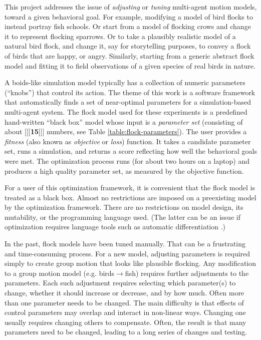 \documentclass[letterpaper]{article}
\begin{document}
This project addresses the issue of \textit{adjusting} or \textit{tuning} multi-agent motion models, toward a given behavioral goal. For example, modifying a model of bird flocks to instead portray fish schools. Or start from a model of flocking crows and change it to represent flocking sparrows. Or to take a plausibly realistic model of a natural bird flock, and change it, say for storytelling purposes, to convey a flock of birds that are happy, or angry. Similarly, starting from a generic abstract flock model and fitting it to field observations of a given species of real birds in nature.

A boids-like simulation model typically has a collection of numeric parameters (``knobs'') that control its action. The theme of this work is a software framework that automatically finds a set of near-optimal parameters for a simulation-based multi-agent system. The flock model used for these experiments is a predefined hand-written ``black box'' model whose input is a \textit{parameter set} (consisting of about [[[\textbf{15}]]] numbers, see Table \ref{table:flock-parameters}). The user provides a \textit{fitness} (also known as \textit{objective} or \textit{loss}) function. It takes a candidate parameter set, runs a simulation, and returns a score reflecting how well the behavioral goals were met. The optimization process runs (for about two hours on a laptop) and produces a high quality parameter set, as measured by the objective function.

For a user of this optimization framework, it is convenient that the flock model is treated as a black box. Almost no restrictions are imposed on a preexisting model by the optimization framework. There are no restrictions on model design, its mutability, or the programming language used. (The latter can be an issue if optimization requires language tools such as automatic differentiation \citep{baydin_automatic_2018}.)

In the past, flock models have been tuned manually. That can be a frustrating and time-consuming process. For a new model, adjusting parameters is required simply to create group motion that looks like plausible flocking. Any modification to a group motion model (e.g. birds{$\rightarrow$}fish) requires further adjustments to the parameters. Each such adjustment requires selecting which parameter(s) to change, whether it should increase or decrease, and by how much. Often more than one parameter needs to be changed. The main difficulty is that effects of control parameters may overlap and interact in non-linear ways. Changing one usually requires changing others to compensate. Often, the result is that many parameters need to be changed, leading to a long series of changes and testing.
\end{document}
